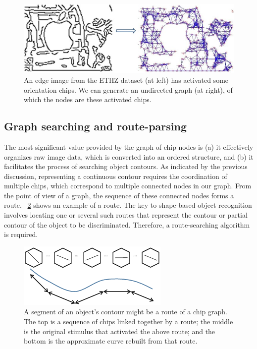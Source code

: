 \documentclass[journal]{IEEEtran}
\begin{document}
\begin{figure}[!t]
\centering
\includegraphics[width=0.85\linewidth]{images/fig8.jpg}
\caption{An edge image from the ETHZ dataset (at left) has activated some orientation chips. 
We can generate an undirected graph (at right), of which the nodes are these activated chips.}
\label{fig:8}
\end{figure}

\subsection{Graph searching and route-parsing}

The most significant value provided by the graph of chip nodes is 
(a) it effectively organizes raw image data, which is converted into an ordered structure, 
and (b) it facilitates the process of searching object contours. 
As indicated by the previous discussion, 
representing a continuous contour requires the coordination of multiple chips, 
which correspond to multiple connected nodes in our graph.
From the point of view of a graph, the sequence of these connected nodes forms a route.
\figurename~\ref{fig:9} shows an example of a route. 
The key to shape-based object recognition involves locating one or several such routes
that represent the contour or partial contour of the object to be discriminated.
Therefore, a route-searching algorithm is required.

\begin{figure}[!t]
\centering
\includegraphics[width=0.5\linewidth]{images/fig9.png}
\caption{A segment of an object's contour might be a route of a chip graph. 
The top is a sequence of chips linked together by a route; 
the middle is the original stimulus that activated the above route; 
and the bottom is the approximate curve rebuilt from that route. }
\label{fig:9}
\end{figure}
\end{document}
